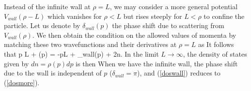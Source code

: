 Instead of the infinite wall at $\rho =L$, we may consider
a more general potential $V_{wall}(\rho-L)$ which vanishes for
$\rho < L$ but rises steeply for $L < \rho$ to confine the particle. 
Let us denote by $\delta_{wall}(p)$ the phase shift due to scattering from 
$V_{wall}(\rho)$. 
We then obtain the condition on the allowed values of momenta by 
matching these two wavefunctions and their derivatives at  $\rho=L$ as
It follows that
{ p L + \delta(p) = -pL + \delta_{wall}(p) + 2\pi n.}
In the limit $L\rightarrow \infty$, the density of states given
by $dn = \rho(p) dp$ is then
When we have the infinite wall, the phase shift due to the wall
is independent of $p$ ($\delta_{wall} = \pi$), 
and (\ref{doswall}) reduces to (\ref{dosmore}). 
  
